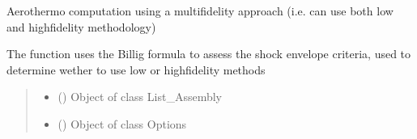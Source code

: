 \documentclass[letterpaper,10pt,english]{sphinxmanual}
\begin{document}
\begin{fulllineitems}
\label{\detokenize{modules:switch.compute_aerothermo}}
\pysigstartsignatures
{}
\pysigstopsignatures
\sphinxAtStartPar
Aerothermo computation using a multi\sphinxhyphen{}fidelity approach (i.e. can use both low\sphinxhyphen{} and high\sphinxhyphen{}fidelity methodology)

\sphinxAtStartPar
The function uses the Billig formula to assess the shock envelope criteria, used to determine wether to use low\sphinxhyphen{} or high\sphinxhyphen{}fidelity methods
\begin{quote}\begin{description}
\begin{itemize}
\item {} 
\sphinxAtStartPar
{} () \textendash{} Object of class List\_Assembly

\item {} 
\sphinxAtStartPar
{} ({\hyperref[\detokenize{modules:configuration.Options}]{}}) \textendash{} Object of class Options

\end{itemize}

\end{description}\end{quote}

\end{fulllineitems}

\end{document}
